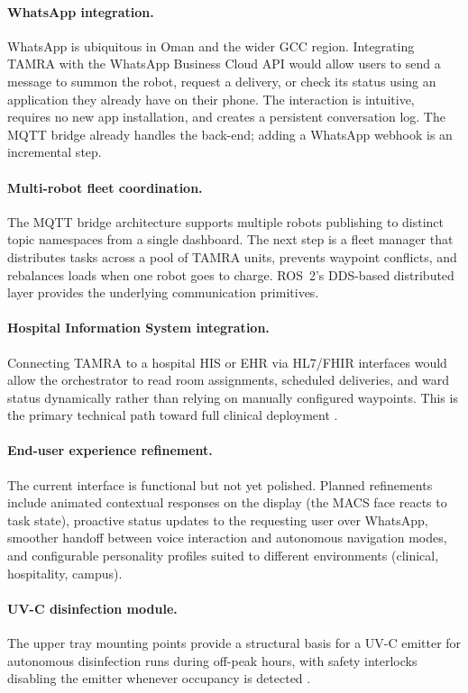 \paragraph{WhatsApp integration.}
WhatsApp is ubiquitous in Oman and the wider GCC region. Integrating TAMRA with the WhatsApp Business Cloud API would allow users to send a message to summon the robot, request a delivery, or check its status using an application they already have on their phone. The interaction is intuitive, requires no new app installation, and creates a persistent conversation log. The MQTT bridge already handles the back-end; adding a WhatsApp webhook is an incremental step.

\paragraph{Multi-robot fleet coordination.}
The MQTT bridge architecture supports multiple robots publishing to distinct topic namespaces from a single dashboard. The next step is a fleet manager that distributes tasks across a pool of TAMRA units, prevents waypoint conflicts, and rebalances loads when one robot goes to charge. ROS~2's DDS-based distributed layer provides the underlying communication primitives.

\paragraph{Hospital Information System integration.}
Connecting TAMRA to a hospital HIS or EHR via HL7/FHIR interfaces would allow the orchestrator to read room assignments, scheduled deliveries, and ward status dynamically rather than relying on manually configured waypoints. This is the primary technical path toward full clinical deployment \cite{jmir2024}.

\paragraph{End-user experience refinement.}
The current interface is functional but not yet polished. Planned refinements include animated contextual responses on the display (the MACS face reacts to task state), proactive status updates to the requesting user over WhatsApp, smoother handoff between voice interaction and autonomous navigation modes, and configurable personality profiles suited to different environments (clinical, hospitality, campus).

\paragraph{UV-C disinfection module.}
The upper tray mounting points provide a structural basis for a UV-C emitter for autonomous disinfection runs during off-peak hours, with safety interlocks disabling the emitter whenever occupancy is detected \cite{sciencedirect2021}.

